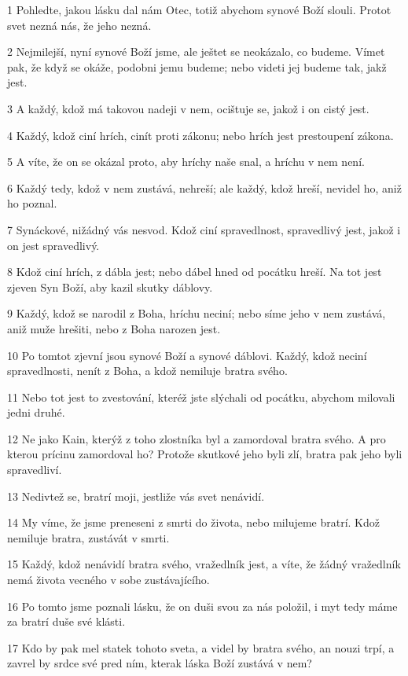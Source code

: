 \par 1 Pohledte, jakou lásku dal nám Otec, totiž abychom synové Boží slouli. Protot svet nezná nás, že jeho nezná.
\par 2 Nejmilejší, nyní synové Boží jsme, ale ještet se neokázalo, co budeme. Vímet pak, že když se okáže, podobni jemu budeme; nebo videti jej budeme tak, jakž jest.
\par 3 A každý, kdož má takovou nadeji v nem, ocištuje se, jakož i on cistý jest.
\par 4 Každý, kdož ciní hrích, cinít proti zákonu; nebo hrích jest prestoupení zákona.
\par 5 A víte, že on se okázal proto, aby hríchy naše snal, a hríchu v nem není.
\par 6 Každý tedy, kdož v nem zustává, nehreší; ale každý, kdož hreší, nevidel ho, aniž ho poznal.
\par 7 Synáckové, nižádný vás nesvod. Kdož ciní spravedlnost, spravedlivý jest, jakož i on jest spravedlivý.
\par 8 Kdož ciní hrích, z dábla jest; nebo dábel hned od pocátku hreší. Na tot jest zjeven Syn Boží, aby kazil skutky dáblovy.
\par 9 Každý, kdož se narodil z Boha, hríchu neciní; nebo síme jeho v nem zustává, aniž muže hrešiti, nebo z Boha narozen jest.
\par 10 Po tomtot zjevní jsou synové Boží a synové dáblovi. Každý, kdož neciní spravedlnosti, nenít z Boha, a kdož nemiluje bratra svého.
\par 11 Nebo tot jest to zvestování, kteréž jste slýchali od pocátku, abychom milovali jedni druhé.
\par 12 Ne jako Kain, kterýž z toho zlostníka byl a zamordoval bratra svého. A pro kterou prícinu zamordoval ho? Protože skutkové jeho byli zlí, bratra pak jeho byli spravedliví.
\par 13 Nedivtež se, bratrí moji, jestliže vás svet nenávidí.
\par 14 My víme, že jsme preneseni z smrti do života, nebo milujeme bratrí. Kdož nemiluje bratra, zustávát v smrti.
\par 15 Každý, kdož nenávidí bratra svého, vražedlník jest, a víte, že žádný vražedlník nemá života vecného v sobe zustávajícího.
\par 16 Po tomto jsme poznali lásku, že on duši svou za nás položil, i myt tedy máme za bratrí duše své klásti.
\par 17 Kdo by pak mel statek tohoto sveta, a videl by bratra svého, an nouzi trpí, a zavrel by srdce své pred ním, kterak láska Boží zustává v nem?
